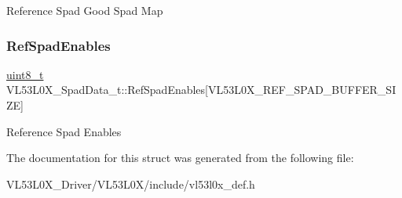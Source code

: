 Reference Spad Good Spad Map \mbox{\label{structVL53L0X__SpadData__t_a812a69fca8ab84bbc7b36d0e3ca1ac48}} 
\subsubsection{\texorpdfstring{Ref\+Spad\+Enables}{RefSpadEnables}}
{\footnotesize\ttfamily \hyperlink{vl53l0x__types_8h_aba7bc1797add20fe3efdf37ced1182c5}{uint8\+\_\+t} V\+L53\+L0\+X\+\_\+\+Spad\+Data\+\_\+t\+::\+Ref\+Spad\+Enables\mbox{[}V\+L53\+L0\+X\+\_\+\+R\+E\+F\+\_\+\+S\+P\+A\+D\+\_\+\+B\+U\+F\+F\+E\+R\+\_\+\+S\+I\+ZE\mbox{]}}

Reference Spad Enables 

The documentation for this struct was generated from the following file\+:\begin{DoxyCompactItemize}
\item 
V\+L53\+L0\+X\+\_\+\+Driver/\+V\+L53\+L0\+X/include/vl53l0x\+\_\+def.\+h\end{DoxyCompactItemize}
